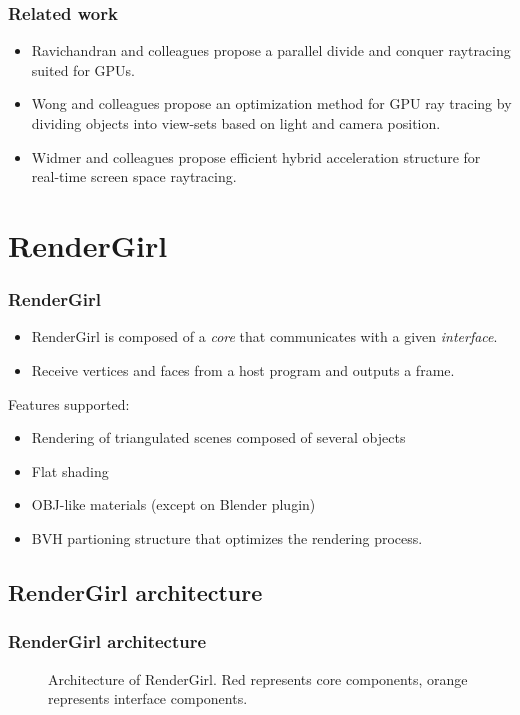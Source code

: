 \documentclass{beamer}
\begin{document}
\begin{frame}
\frametitle{Related work}

\begin{itemize}

\item Ravichandran and colleagues propose a parallel divide and
  conquer raytracing suited for GPUs\cite{Ravichandran}.

\item Wong and colleagues propose an optimization method for GPU ray
  tracing by dividing objects into view-sets based on light and camera
  position\cite{Wong}.

\item Widmer and colleagues propose efficient hybrid acceleration
  structure for real-time screen space raytracing\cite{Widmer}.

\end{itemize}

\end{frame}

\section{RenderGirl}
\begin{frame}
\frametitle{RenderGirl}

\begin{itemize}

\item RenderGirl is composed of a \emph{core} that communicates with a
  given \emph{interface}.

\item Receive vertices and faces from a host program and outputs a
  frame.
\end{itemize}

Features supported:

\begin{itemize}
\item Rendering of triangulated scenes composed of several objects
\item Flat shading
\item OBJ-like materials (except on Blender plugin)
\item BVH partioning structure that optimizes the rendering process.
\end{itemize}

\end{frame}

\subsection{RenderGirl architecture}
\begin{frame}
\frametitle{RenderGirl architecture}

\begin{figure}
\centering

\caption{Architecture of RenderGirl. Red represents core components,
  orange represents interface components.}
\label{fig:architecture}
\end{figure}

\end{frame}
\end{document}
